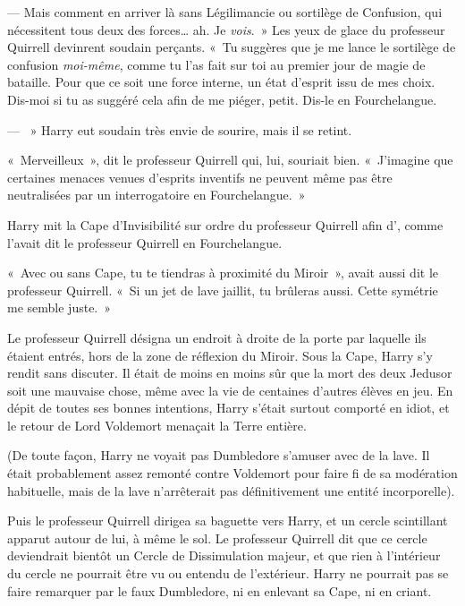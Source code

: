 --- Mais comment en arriver là sans Légilimancie ou sortilège de Confusion, qui nécessitent tous deux des forces… ah.
Je \emph{vois}.~»
Les yeux de glace du professeur Quirrell devinrent soudain perçants.
«~Tu suggères que je me lance le sortilège de confusion \emph{moi-même}, comme tu l'as fait sur toi au premier jour de magie de bataille.
Pour que ce soit une force interne, un état d'esprit issu de mes choix.
Dis-moi si tu as suggéré cela afin de me piéger, petit.
Dis-le en Fourchelangue.

--- ~» Harry eut soudain très envie de sourire, mais il se retint.

«~Merveilleux~», dit le professeur Quirrell qui, lui, souriait bien.
«~J'imagine que certaines menaces venues d'esprits inventifs ne peuvent même pas être neutralisées par un interrogatoire en Fourchelangue.~»

\later

Harry mit la Cape d'Invisibilité sur ordre du professeur Quirrell afin d', comme l'avait dit le professeur Quirrell en Fourchelangue.

«~Avec ou sans Cape, tu te tiendras à proximité du Miroir~», avait aussi dit le professeur Quirrell.
«~Si un jet de lave jaillit, tu brûleras aussi.
Cette symétrie me semble juste.~»

Le professeur Quirrell désigna un endroit à droite de la porte par laquelle ils étaient entrés, hors de la zone de réflexion du Miroir.
Sous la Cape, Harry s'y rendit sans discuter.
Il était de moins en moins sûr que la mort des deux Jedusor soit une mauvaise chose, même avec la vie de centaines d'autres élèves en jeu.
En dépit de toutes ses bonnes intentions, Harry s'était surtout comporté en idiot, et le retour de Lord Voldemort menaçait la Terre entière.

(De toute façon, Harry ne voyait pas Dumbledore s'amuser avec de la lave.
Il était probablement assez remonté contre Voldemort pour faire fi de sa modération habituelle, mais de la lave n'arrêterait pas définitivement une entité incorporelle).

Puis le professeur Quirrell dirigea sa baguette vers Harry, et un cercle scintillant apparut autour de lui, à même le sol.
Le professeur Quirrell dit que ce cercle deviendrait bientôt un Cercle de Dissimulation majeur, et que rien à l'intérieur du cercle ne pourrait être vu ou entendu de l'extérieur.
Harry ne pourrait pas se faire remarquer par le faux Dumbledore, ni en enlevant sa Cape, ni en criant.

